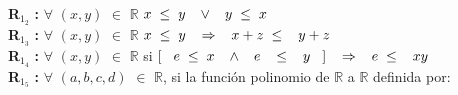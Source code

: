 \documentclass[12pt]{article}
\begin{document}
\textbf{R}$_1_2$ \hspace{0.1cm}\textbf{:} $\forall$ $ ( x , y) $ $\in$ $\mathbb{R}$ \hspace{0.4cm} $ x\hspace{0.1 cm}\leq \hspace{0.1 cm} y \hspace{0.3 cm} \vee \hspace{0.3cm} y\hspace{0.1 cm} \leq \hspace{0.1 cm} x \hspace{0.3 cm}$\\

\textbf{R}$_1_3$ \hspace{0.1cm}\textbf{:} $\forall$ $ ( x , y) $ $\in$ $\mathbb{R}$ \hspace{0.4cm} $ x\hspace{0.1 cm}\leq \hspace{0.1 cm} y \hspace{0.3 cm} \Rightarrow \hspace{0.3cm} x+z \hspace{0.1 cm}\leq \hspace{0.3 cm} y+z $\\

\textbf{R}$_1_4$ \hspace{0.1cm}\textbf{:} $\forall$ $ ( x , y) $ $\in$ $\mathbb{R}$ \hspace{0.4cm} si \hspace{0.3cm}$ \left[\hspace{0.3 cm} e\hspace{0.1 cm}\leq \hspace{0.1 cm} x\hspace{0.3 cm} \wedge \hspace{0.3 cm} e \hspace{0.3 cm} \leq \hspace{0.3 cm} y\hspace{0.3 cm} \right] \hspace{0.3 cm} \Rightarrow \hspace{0.3cm} e \hspace{0.1 cm}\leq \hspace{0.3 cm} xy$\\

\textbf{R}$_1_5$ \hspace{0.1cm}\textbf{:} $\forall$ $ ( a , b, c, d)$ $\in$ $\mathbb{R}$, si la función polinomio de $\mathbb{R}$ a $\mathbb{R}$ definida por:\\
\end{document}
